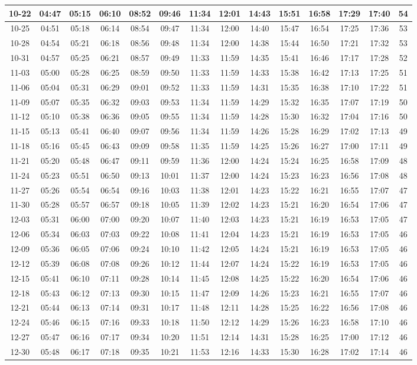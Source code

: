 \begin{footnotesize}
\begin{longtable}{c | c | c | c | c | c | c | c | c | c | c | c | c | c}
		10-22&04:47&05:15&06:10&08:52&09:46&11:34&12:01&14:43&15:51&16:58&17:29&17:40&54\\\hline
		10-25&04:51&05:18&06:14&08:54&09:47&11:34&12:00&14:40&15:47&16:54&17:25&17:36&53\\\hline
		10-28&04:54&05:21&06:18&08:56&09:48&11:34&12:00&14:38&15:44&16:50&17:21&17:32&53\\\hline
		10-31&04:57&05:25&06:21&08:57&09:49&11:33&11:59&14:35&15:41&16:46&17:17&17:28&52\\\hline
		11-03&05:00&05:28&06:25&08:59&09:50&11:33&11:59&14:33&15:38&16:42&17:13&17:25&51\\\hline
		11-06&05:04&05:31&06:29&09:01&09:52&11:33&11:59&14:31&15:35&16:38&17:10&17:22&51\\\hline
		11-09&05:07&05:35&06:32&09:03&09:53&11:34&11:59&14:29&15:32&16:35&17:07&17:19&50\\\hline
		11-12&05:10&05:38&06:36&09:05&09:55&11:34&11:59&14:28&15:30&16:32&17:04&17:16&50\\\hline
		11-15&05:13&05:41&06:40&09:07&09:56&11:34&11:59&14:26&15:28&16:29&17:02&17:13&49\\\hline
		11-18&05:16&05:45&06:43&09:09&09:58&11:35&11:59&14:25&15:26&16:27&17:00&17:11&49\\\hline
		11-21&05:20&05:48&06:47&09:11&09:59&11:36&12:00&14:24&15:24&16:25&16:58&17:09&48\\\hline
		11-24&05:23&05:51&06:50&09:13&10:01&11:37&12:00&14:24&15:23&16:23&16:56&17:08&48\\\hline
		11-27&05:26&05:54&06:54&09:16&10:03&11:38&12:01&14:23&15:22&16:21&16:55&17:07&47\\\hline
		11-30&05:28&05:57&06:57&09:18&10:05&11:39&12:02&14:23&15:21&16:20&16:54&17:06&47\\\hline
		12-03&05:31&06:00&07:00&09:20&10:07&11:40&12:03&14:23&15:21&16:19&16:53&17:05&47\\\hline
		12-06&05:34&06:03&07:03&09:22&10:08&11:41&12:04&14:23&15:21&16:19&16:53&17:05&46\\\hline
		12-09&05:36&06:05&07:06&09:24&10:10&11:42&12:05&14:24&15:21&16:19&16:53&17:05&46\\\hline
		12-12&05:39&06:08&07:08&09:26&10:12&11:44&12:07&14:24&15:22&16:19&16:53&17:05&46\\\hline
		12-15&05:41&06:10&07:11&09:28&10:14&11:45&12:08&14:25&15:22&16:20&16:54&17:06&46\\\hline
		12-18&05:43&06:12&07:13&09:30&10:15&11:47&12:09&14:26&15:23&16:21&16:55&17:07&46\\\hline
		12-21&05:44&06:13&07:14&09:31&10:17&11:48&12:11&14:28&15:25&16:22&16:56&17:08&46\\\hline
		12-24&05:46&06:15&07:16&09:33&10:18&11:50&12:12&14:29&15:26&16:23&16:58&17:10&46\\\hline
		12-27&05:47&06:16&07:17&09:34&10:20&11:51&12:14&14:31&15:28&16:25&17:00&17:12&46\\\hline
		12-30&05:48&06:17&07:18&09:35&10:21&11:53&12:16&14:33&15:30&16:28&17:02&17:14&46\\\hline
\end{longtable}\end{footnotesize}

​

